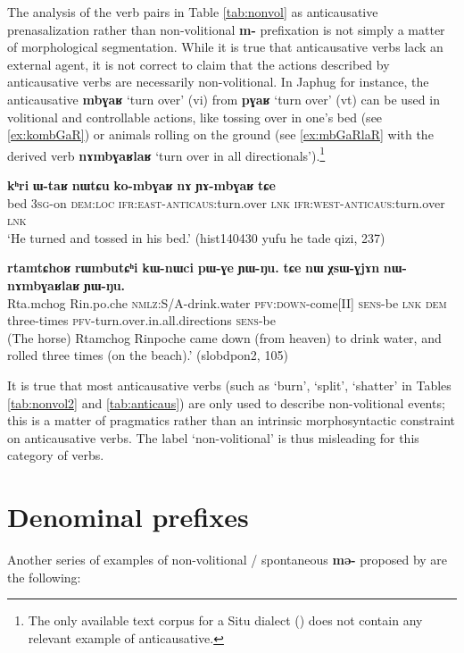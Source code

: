 \documentclass[oneside,a4paper,11pt]{article}
\newcommand{\ipa}[1]{\textbf{{\phon\mbox{#1}}}} %
\begin{document}
The analysis of the verb pairs in Table \ref{tab:nonvol} as anticausative prenasalization rather than non-volitional \ipa{m-} prefixation is not simply a matter of morphological segmentation. While it is true that anticausative verbs lack an external agent, it is not correct to claim that the actions described by anticausative verbs are necessarily non-volitional. In Japhug for instance, the anticausative \ipa{mbɣaʁ} `turn over' (vi) from \ipa{pɣaʁ} `turn over' (vt) can be used in volitional and controllable actions, like tossing over in one's bed (see \ref{ex:kombGaR}) or animals rolling on the ground (see \ref{ex:mbGaRlaR} with  the derived verb \ipa{nɤmbɣaʁlaʁ} `turn over in all directionals').\footnote{The only available text corpus for a Situ dialect (\citealt{linyj16cogtse}) does not contain any relevant example of anticausative.}


 \begin{exe}
\ex \label{ex:kombGaR}
\gll \ipa{kʰri} 	\ipa{ɯ-taʁ} 	\ipa{nɯtɕu} 	\ipa{ko-mbɣaʁ} 	\ipa{nɤ} 	\ipa{ɲɤ-mbɣaʁ} 	\ipa{tɕe}  \\
bed \textsc{3sg}-on \textsc{dem:loc} \textsc{ifr:east-anticaus}:turn.over \textsc{lnk} \textsc{ifr:west-anticaus}:turn.over \textsc{lnk} \\
\glt `He turned and tossed in his bed.' (hist140430 yufu he tade qizi, 237)
\end{exe}

 \begin{exe}
\ex \label{ex:mbGaRlaR}
\gll \ipa{rtamtɕhoʁ} 	\ipa{rɯmbutɕʰi} 	\ipa{kɯ-nɯci} 	\ipa{pɯ-ɣe} 	\ipa{ɲɯ-ŋu.} \ipa{tɕe} 	\ipa{nɯ} 	\ipa{χsɯ-ɣjɤn} 	\ipa{nɯ-nɤmbɣaʁlaʁ} 	\ipa{ɲɯ-ŋu.}  \\
 Rta.mchog Rin.po.che \textsc{nmlz}:S/A-drink.water \textsc{pfv:down}-come[II]  \textsc{sens}-be \textsc{lnk} \textsc{dem} three-times \textsc{pfv}-turn.over.in.all.directions  \textsc{sens}-be \\
\glt  (The horse) Rtamchog Rinpoche came down (from heaven) to drink water, and rolled three times (on the beach).' (slobdpon2, 105)
 \end{exe}

It is true that most anticausative verbs (such as `burn', `split', `shatter' in Tables \ref{tab:nonvol2} and \ref{tab:anticaus}) are only used to describe non-volitional events; this is a matter of pragmatics rather than an intrinsic morphosyntactic constraint on anticausative verbs. The label `non-volitional' is thus misleading for this category of verbs.

\section{Denominal prefixes}
Another series of examples of non-volitional / spontaneous \ipa{mə-} proposed by \citet[506]{prins16kyomkyo}  are the following:
\end{document}
